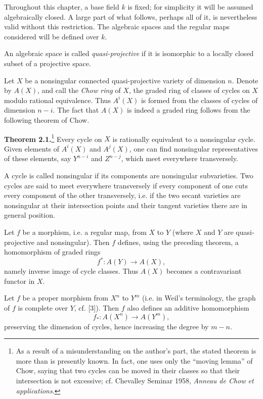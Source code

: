 \documentclass[11pt]{article}
\begin{document}
Throughout this chapter, a base field $k$ is fixed; for simplicity it will be assumed algebraically closed. A large part of what follows, perhaps all of it, is nevertheless valid without this restriction. The algebraic spaces and the regular maps considered will be defined over $k$.

An algebraic space is called \emph{quasi-projective} if it is isomorphic to a locally closed subset of a projective space.

Let $X$ be a nonsingular connected quasi-projective variety of dimension $n$. Denote by $A(X)$, and call the \emph{Chow ring} of $X$, the graded ring of classes of cycles on $X$ modulo rational equivalence. Thus $A^i(X)$ is formed from the classes of cycles of dimension $n-i$. The fact that $A(X)$ is indeed a graded ring follows from the following theorem of Chow.

\textbf{Theorem 2.1.}\footnote{As a result of a misunderstanding on the author's part, the stated theorem is more than is presently known. In fact, one uses only the ``moving lemma'' of Chow, saying that two cycles can be moved in their classes so that their intersection is not excessive; cf. Chevalley Seminar 1958, \emph{Anneau de Chow et applications}.} Every cycle on $X$ is rationally equivalent to a nonsingular cycle. Given elements of $A^i(X)$ and $A^j(X)$, one can find nonsingular representatives of these elements, say $Y^{n-i}$ and $Z^{n-j}$, which meet everywhere transversely.

A cycle is called nonsingular if its components are nonsingular subvarieties. Two cycles are said to meet everywhere transversely if every component of one cuts every component of the other transversely, i.e. if the two secant varieties are nonsingular at their intersection points and their tangent varieties there are in general position.

Let $f$ be a morphism, i.e. a regular map, from $X$ to $Y$ (where $X$ and $Y$ are quasi-projective and nonsingular). Then $f$ defines, using the preceding theorem, a homomorphism of graded rings
\begin{equation}\tag{2.1}
f^*:A(Y)\longrightarrow A(X),
\end{equation}
namely inverse image of cycle classes. Thus $A(X)$ becomes a contravariant functor in $X$.

Let $f$ be a proper morphism from $X^n$ to $Y^m$ (i.e. in Weil's terminology, the graph of $f$ is complete over $Y$, cf. [3]). Then $f$ also defines an additive homomorphism
\begin{equation}\tag{2.2}
f_*:A(X^n)\longrightarrow A(Y^m),
\end{equation}
preserving the dimension of cycles, hence increasing the degree by $m-n$.
\end{document}

